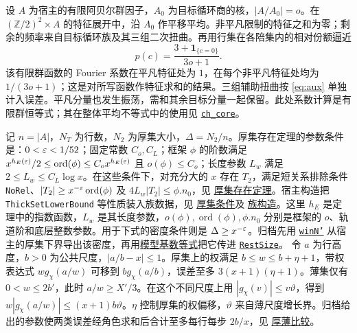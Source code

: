 \documentclass[UTF8,fontset=none,a4paper,11pt]{ctexart}
\theoremstyle{definition}
\newcommand{\src}[3]{\href{https://github.com/leanprover-community/riemann-hypothesis/blob/23aebbb302010b292314d406aa97f7901d698634/src/#1.lean\#L#2}{#3}}
\begin{document}
设 $A$ 为宿主的有限阿贝尔群因子，$A_0$ 为目标循环商的核，$|A/A_0|=o$。在 $(\mathbb Z/2)^2\times A$ 的特征展开中，沿 $A_0$ 作平移平均。非平凡限制的特征之和为零；剩余的频率来自目标循环族及其三组二次扭曲。再用行集在各陪集内的相对份额逼近
\[
 p(c)=\frac{3+\mathbf1_{\{c=0\}}}{3o+1}.
\]
该有限群函数的 Fourier 系数在平凡特征处为 $1$，在每个非平凡特征处均为 $1/(3o+1)$；这是对所写函数作特征求和的结果。三组辅助扭曲按 \eqref{eq:aux} 单独计入误差。平凡分量也发生振荡，需和其余目标分量一起保留。此处系数计算是有限群恒等式；其在整体平均不等式中的使用见 \src{Development/AutomorphicArithmetic/DedekindLFunctions/LandauTheorems/ChCore}{343}{\texttt{ch\_core}}。

记 $n=|A|$，$N_T$ 为行数，$N_2$ 为厚集大小，$\Delta=N_2/n$。厚集存在定理的参数条件是：$0<\varepsilon<1/52$；固定常数 $C_o,C_L$；框架 $\phi$ 的阶数满足 $x^{h_E(\varepsilon)}/2\le\operatorname{ord}(\phi)\le C_o x^{h_E(\varepsilon)}$ 且 $o(\phi)\le C_o$；长度参数 $L_w$ 满足 $2\le L_w\le C_L\log x$。在这些条件下，对充分大的 $x$ 存在 $T_2$，满足短关系排除条件 \texttt{NoRel}、$|T_2|\ge x^{-\varepsilon}\operatorname{ord}(\phi)$ 及 $4L_w|T_2|\le\phi.n_0$，见 \src{Development/AutomorphicArithmetic/ThickFrames/ThickFrame2Large}{29}{厚集存在定理}。宿主构造把 \texttt{ThickSetLowerBound} 等性质装入族数据，见 \src{Development/AutomorphicArithmetic/CharacterBoxes/DesignS}{38}{厚集条件}及 \src{Development/AutomorphicArithmetic/CharacterBoxes/DesignS}{47}{族构造}。这里 $h_E$ 是定理中的指数函数，$L_w$ 是其长度参数，$o(\phi),\operatorname{ord}(\phi),\phi.n_0$ 分别是框架的 $o$、轨道阶和底层整数参数。用于下式的密度条件则是 $\Delta\ge x^{-\varepsilon}$。归档先用 \src{Formalism/SharpRestriction/GlobalSchurBounds/QuadraticLogDerivCongr}{1731}{\texttt{winN'}} 从宿主的厚集下界导出该密度，再用\src{Formalism/SharpRestriction/GlobalSchurBounds/QuadraticLogDerivCongr}{1102}{模型基数等式}把它传进 \src{Formalism/SizeWindowBrackets/SChain}{53}{\texttt{RestSize}}。
令 $a$ 为行高度，$b>0$ 为公共尺度，$|a/b-x|\le1$。厚集上的权满足 $b\le w\le b+\eta+1$，带权表达式 $w g_\chi(a/w)$ 可移到 $b g_\chi(a/b)$，误差至多 $3(x+1)(\eta+1)$。薄集仅有 $0<w\le2b'$，此时 $a/w\ge X'/3$。在这个不同尺度上用 $|g_\chi(v)|\le v\vartheta$，得到 $w|g_\chi(a/w)|\le(x+1)b\vartheta$。$\eta$ 控制厚集的权偏移，$\vartheta$ 来自薄尺度增长界。归档给出的参数使两类误差经角色求和后合计至多每行每步 $2b/x$，见 \src{Development/AutomorphicArithmetic/DedekindLFunctions/LandauTheorems/ChCore}{75}{厚薄比较}。
\end{document}
